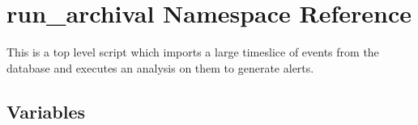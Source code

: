 \hypertarget{namespacerun__archival}{\section{run\-\_\-archival Namespace Reference}
\label{namespacerun__archival}
}


\begin{DoxyVerb} This is a top level script which imports
 a large timeslice of events from the database and
 executes an analysis on them to generate alerts.\end{DoxyVerb}
  


\subsection*{Variables}
